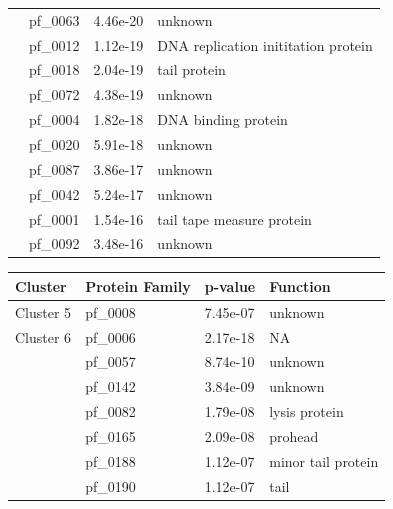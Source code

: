 \begin{table}
\begin{lrbox}{\leftbox}
\begin{tabular}[t]{llll}
                                        & pf\_0063 & 4.46e-20 & unknown \\ 
                                        & pf\_0012 & 1.12e-19 & DNA replication inititation protein \\ 
                                        & pf\_0018 & 2.04e-19 & tail protein \\ 
                                        & pf\_0072 & 4.38e-19 & unknown \\ 
                                        & pf\_0004 & 1.82e-18 & DNA binding protein \\ 
                                        & pf\_0020 & 5.91e-18 & unknown \\ 
                                        & pf\_0087 & 3.86e-17 & unknown \\ 
                                        & pf\_0042 & 5.24e-17 & unknown \\ 
                                        & pf\_0001 & 1.54e-16 & tail tape measure protein \\ 
                                        & pf\_0092 & 3.48e-16 & unknown \\ 
            \midrule
            \end{tabular}
    \end{lrbox}
    \begin{lrbox}{\rightbox}
            \begin{tabular}[t]{llll}
            \toprule
            Cluster & Protein Family & p-value & Function \\
            \midrule
            \multirow{1}{*}{Cluster 5} & pf\_0008 & 7.45e-07 & unknown \\ 
            \midrule
            \multirow{1}{*}{Cluster 6} & pf\_0006 & 2.17e-18 & NA \\ 
                                        & pf\_0057 & 8.74e-10 & unknown \\ 
                                        & pf\_0142 & 3.84e-09 & unknown \\ 
                                        & pf\_0082 & 1.79e-08 & lysis protein \\ 
                                        & pf\_0165 & 2.09e-08 & prohead \\ 
                                        & pf\_0188 & 1.12e-07 & minor tail protein \\ 
                                        & pf\_0190 & 1.12e-07 & tail \\ 

\end{tabular}
\end{lrbox}
\end{table}
